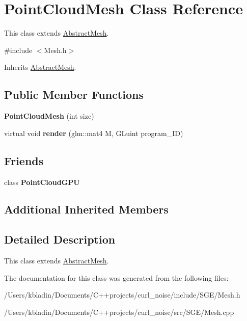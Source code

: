 \hypertarget{class_point_cloud_mesh}{\section{Point\-Cloud\-Mesh Class Reference}
\label{class_point_cloud_mesh}
}


This class extends \hyperlink{class_abstract_mesh}{Abstract\-Mesh}.  




{\ttfamily \#include $<$Mesh.\-h$>$}



Inherits \hyperlink{class_abstract_mesh}{Abstract\-Mesh}.

\subsection*{Public Member Functions}
\begin{DoxyCompactItemize}
\item 
\hypertarget{class_point_cloud_mesh_ac5f7bbd9c3e3dad1c472ba7d588e1570}{{\bfseries Point\-Cloud\-Mesh} (int size)}\label{class_point_cloud_mesh_ac5f7bbd9c3e3dad1c472ba7d588e1570}

\item 
\hypertarget{class_point_cloud_mesh_a1c04f9d4631dc9c92789e9680a7a1801}{virtual void {\bfseries render} (glm\-::mat4 M, G\-Luint program\-\_\-\-I\-D)}\label{class_point_cloud_mesh_a1c04f9d4631dc9c92789e9680a7a1801}

\end{DoxyCompactItemize}
\subsection*{Friends}
\begin{DoxyCompactItemize}
\item 
\hypertarget{class_point_cloud_mesh_af667c5f1e89335dfc954b43e5643ad45}{class {\bfseries Point\-Cloud\-G\-P\-U}}\label{class_point_cloud_mesh_af667c5f1e89335dfc954b43e5643ad45}

\end{DoxyCompactItemize}
\subsection*{Additional Inherited Members}


\subsection{Detailed Description}
This class extends \hyperlink{class_abstract_mesh}{Abstract\-Mesh}. 

The documentation for this class was generated from the following files\-:\begin{DoxyCompactItemize}
\item 
/\-Users/kbladin/\-Documents/\-C++projects/curl\-\_\-noise/include/\-S\-G\-E/Mesh.\-h\item 
/\-Users/kbladin/\-Documents/\-C++projects/curl\-\_\-noise/src/\-S\-G\-E/Mesh.\-cpp\end{DoxyCompactItemize}
